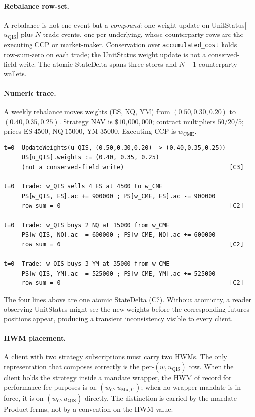 \documentclass[11pt,a4paper]{article}
\begin{document}
\paragraph{Rebalance row-set.} A rebalance is not one event but a \emph{compound}: one weight-update on UnitStatus[$u_{\mathrm{QIS}}$] plus $N$ trade events, one per underlying, whose counterparty rows are the executing CCP or market-maker. Conservation over \texttt{accumulated\_cost} holds row-sum-zero on each trade; the UnitStatus weight update is not a conserved-field write. The atomic StateDelta spans three stores and $N+1$ counterparty wallets.

\paragraph{Numeric trace.} A weekly rebalance moves weights (ES, NQ, YM) from $(0.50, 0.30, 0.20)$ to $(0.40, 0.35, 0.25)$. Strategy NAV is $\$10{,}000{,}000$; contract multipliers $50/20/5$; prices ES $4500$, NQ $15000$, YM $35000$. Executing CCP is $w_{\mathrm{CME}}$.

\begin{lstlisting}
t=0  UpdateWeights(u_QIS, (0.50,0.30,0.20) -> (0.40,0.35,0.25))
     US[u_QIS].weights := (0.40, 0.35, 0.25)
     (not a conserved-field write)                              [C3]

t=0  Trade: w_QIS sells 4 ES at 4500 to w_CME
     PS[w_QIS, ES].ac += 900000 ; PS[w_CME, ES].ac -= 900000
     row sum = 0                                                [C2]

t=0  Trade: w_QIS buys 2 NQ at 15000 from w_CME
     PS[w_QIS, NQ].ac -= 600000 ; PS[w_CME, NQ].ac += 600000
     row sum = 0                                                [C2]

t=0  Trade: w_QIS buys 3 YM at 35000 from w_CME
     PS[w_QIS, YM].ac -= 525000 ; PS[w_CME, YM].ac += 525000
     row sum = 0                                                [C2]
\end{lstlisting}

\noindent The four lines above are one atomic StateDelta (C3). Without atomicity, a reader observing UnitStatus might see the new weights before the corresponding futures positions appear, producing a transient inconsistency visible to every client.

\paragraph{HWM placement.} A client with two strategy subscriptions must carry two HWMs. The only representation that composes correctly is the per-$(w, u_{\mathrm{QIS}})$ row. When the client holds the strategy inside a mandate wrapper, the HWM of record for performance-fee purposes is on $(w_C, u_{\mathrm{MA,C}})$; when no wrapper mandate is in force, it is on $(w_C, u_{\mathrm{QIS}})$ directly. The distinction is carried by the mandate ProductTerms, not by a convention on the HWM value.
\end{document}
